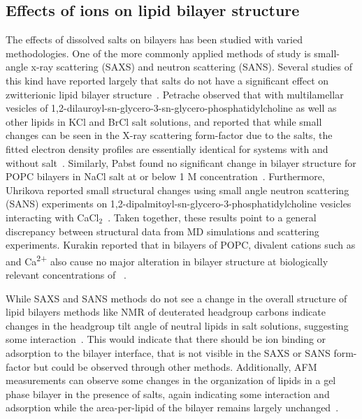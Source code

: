 \subsection{Effects of ions on lipid bilayer structure}
The effects of dissolved salts on bilayers has been studied with varied methodologies. 
One of the more commonly applied methods of study
is small-angle x-ray scattering (SAXS) and neutron scattering (SANS). 
Several studies of this kind have reported
largely that salts do not have a significant effect on zwitterionic lipid bilayer 
structure~\cite{pabst:2007,petrache:2006:swelling,uhrikova:2008,kurakin:2021:effect}.
Petrache \etal{} observed that with multilamellar vesicles of 1,2-dilauroyl-sn-glycero-3-sn-glycero-phosphatidylcholine 
as well as other lipids in KCl and BrCl salt solutions, 
and reported that while small changes can be seen in the
X-ray scattering form-factor due to the 
salts, 
the fitted electron density profiles are essentially identical for
systems with and without 
salt~\cite{petrache:2006:swelling}. 
Similarly, Pabst \etal{} found no significant change in bilayer structure 
for POPC bilayers in NaCl salt at or below 1 M concentration~\cite{pabst:2007}.
Furthermore, Uhrikova \etal{} reported small structural changes using small angle neutron scattering
(SANS) experiments on 1,2-dipalmitoyl-sn-glycero-3-phosphatidylcholine 
vesicles interacting with CaCl$_{2}$~\cite{uhrikova:2008}. 
Taken together, these results point to a general discrepancy between structural data 
from MD simulations and scattering experiments.
Kurakin \etal{} reported that in bilayers of POPC, divalent cations such as \mg{} and Ca\textsuperscript{2+} also cause
no major alteration in bilayer structure at biologically relevant concentrations of \mg~\cite{kurakin:2021:effect}.

While SAXS and SANS methods do not see a change in the overall structure of lipid bilayers methods like NMR of deuterated headgroup carbons 
indicate changes in the headgroup tilt angle of neutral lipids in salt solutions, suggesting some interaction~\cite{akutsu:1981,seelig:1987}. 
This would indicate that there should be ion binding or adsorption to the bilayer interface, that is not visible in the SAXS or SANS form-factor but 
could be observed through other methods. Additionally, AFM measurements can observe some changes in the organization of lipids in a 
gel phase bilayer in the presence of salts, again indicating some interaction 
and adsorption while the area-per-lipid of the bilayer remains largely unchanged~\cite{ferber:2011:direct}.

